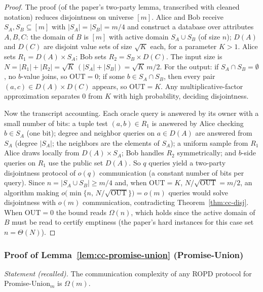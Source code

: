 \begin{proof}
The proof (of the paper's two-party lemma, transcribed with cleaned notation)
reduces disjointness on universe $[m]$. Alice and Bob receive $S_A, S_B \subseteq
[m]$ with $|S_A| = |S_B| = m/4$ and construct a database over attributes $A, B, C$:
the domain of $B$ is $[m]$ with active domain $S_A \cup S_B$ (of size $n$); $D(A)$
and $D(C)$ are disjoint value sets of size $\sqrt{K}$ each, for a parameter
$K > 1$. Alice sets $R_1 = D(A) \times S_A$; Bob sets $R_2 = S_B \times D(C)$. The
input size is $N = |R_1| + |R_2| = \sqrt{K}\,(|S_A| + |S_B|) = \sqrt{K}\, m/2$.
For the output: if $S_A \cap S_B = \emptyset$, no $b$-value joins, so
$\mathrm{OUT} = 0$; if some $b \in S_A \cap S_B$, then every pair
$(a,c) \in D(A) \times D(C)$ appears, so $\mathrm{OUT} = K$. Any
multiplicative-factor approximation separates $0$ from $K$ with high probability,
deciding disjointness.

Now the transcript accounting. Each oracle query is answered by its owner with a
small number of bits: a tuple test $(a,b) \in R_1$ is answered by Alice checking
$b \in S_A$ (one bit); degree and neighbor queries on $a \in D(A)$ are answered
from $S_A$ (degree $|S_A|$; the neighbors are the elements of $S_A$); a uniform
sample from $R_1$ Alice draws locally from $D(A) \times S_A$; Bob handles $R_2$
symmetrically; and $b$-side queries on $R_1$ use the public set $D(A)$. So $q$
queries yield a two-party disjointness protocol of $o(q)$ communication (a constant
number of bits per query). Since $n = |S_A \cup S_B| \ge m/4$ and, when
$\mathrm{OUT} = K$, $N/\sqrt{\mathrm{OUT}} = m/2$, an algorithm making
$o\bigl(\min\{n,\, N/\sqrt{\mathrm{OUT}}\}\bigr) = o(m)$ queries would solve
disjointness with $o(m)$ communication, contradicting
Theorem~\ref{thm:cc-disj}. When $\mathrm{OUT} = 0$ the bound reads $\Omega(n)$,
which holds since the active domain of $B$ must be read to certify emptiness (the
paper's hard instances for this case set $n = \Theta(N)$).
\end{proof}

\subsubsection*{Proof of Lemma~\ref{lem:cc-promise-union} (Promise-Union)}
{\itshape Statement (recalled).} The communication complexity of any ROPD protocol
for Promise-Union$_m$ is $\Omega(m)$.\eop


